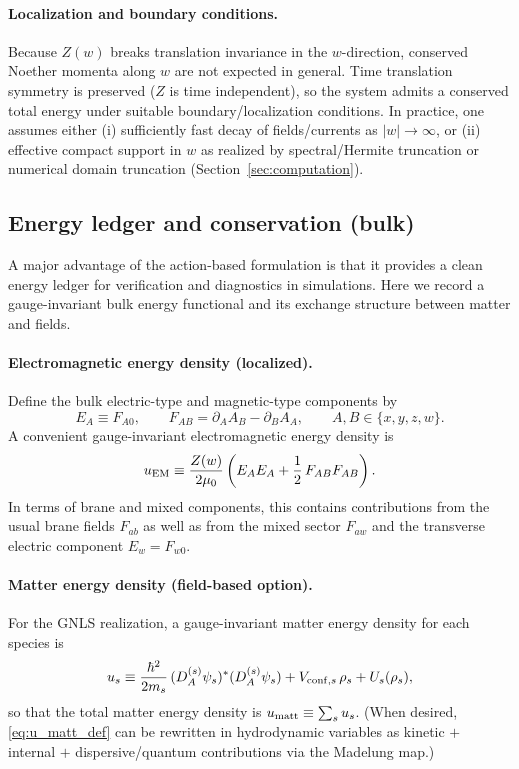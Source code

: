 \documentclass[11pt]{article}
\newcommand{\F}{F}              %
\newcommand{\Z}{Z}              %
\newcommand{\muzero}{\mu_0}
\begin{document}
\paragraph{Localization and boundary conditions.}
Because \(\Z(w)\) breaks translation invariance in the \(w\)-direction, conserved
Noether momenta along \(w\) are not expected in general. Time translation symmetry
is preserved (\(\Z\) is time independent), so the system admits a conserved total
energy under suitable boundary/localization conditions. In practice, one assumes
either (i) sufficiently fast decay of fields/currents as \(|w|\to\infty\), or (ii)
effective compact support in \(w\) as realized by spectral/Hermite truncation or
numerical domain truncation (Section~\ref{sec:computation}).

\subsection{Energy ledger and conservation (bulk)}
\label{sec:bulk_energy}

A major advantage of the action-based formulation is that it provides a clean
energy ledger for verification and diagnostics in simulations. Here we record a
gauge-invariant bulk energy functional and its exchange structure between matter
and fields.

\paragraph{Electromagnetic energy density (localized).}
Define the bulk electric-type and magnetic-type components by
\begin{equation}
E_A \equiv \F_{A0},
\qquad
\F_{AB}=\partial_A A_B-\partial_B A_A,
\qquad A,B\in\{x,y,z,w\}.
\end{equation}
A convenient gauge-invariant electromagnetic energy density is
\begin{equation}
u_{\rm EM}
\equiv
\frac{\Z(w)}{2\muzero}
\left(
E_A E_A
+
\frac12\,\F_{AB}\F_{AB}
\right).
\label{eq:u_em_def}
\end{equation}
In terms of brane and mixed components, this contains contributions from the usual
brane fields \(\F_{ab}\) as well as from the mixed sector \(\F_{aw}\) and the
transverse electric component \(E_w=\F_{w0}\).

\paragraph{Matter energy density (field-based option).}
For the GNLS realization, a gauge-invariant matter energy density for each species
is
\begin{equation}
u_s
\equiv
\frac{\hbar^2}{2m_s}\,(D_A^{(s)}\psi_s)^\ast(D_A^{(s)}\psi_s)
+V_{{\rm conf},s}\,\rho_s
+U_s(\rho_s),
\label{eq:u_matt_def}
\end{equation}
so that the total matter energy density is \(u_{\rm matt}\equiv\sum_s u_s\).
(When desired, \eqref{eq:u_matt_def} can be rewritten in hydrodynamic variables as
kinetic \(+\) internal \(+\) dispersive/quantum contributions via the Madelung map.)
\end{document}
